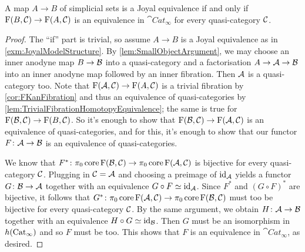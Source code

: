 \begin{lem}\label{lem:JoyalEquivalence}
	A map $A\rightarrow B$ of simplicial sets is a Joyal equivalence if and only if $\operatorname{F}(B,\mathcal{C})\rightarrow\operatorname{F}(A,\mathcal{C})$ is an equivalence in $\cat{Cat}_\infty$ for every quasi-category $\mathcal{C}$.
\end{lem}
\begin{proof}
	The \enquote{if} part is trivial, so assume $A\rightarrow B$ is a Joyal equivalence as in \cref{exm:JoyalModelStructure}.  By \cref{lem:SmallObjectArgument}, we may choose an inner anodyne map $B\rightarrow\mathcal{B}$ into a quasi-category and a factorisation $A\rightarrow\mathcal{A}\rightarrow\mathcal{B}$ into an inner anodyne map followed by an inner fibration. Then $\mathcal{A}$ is a quasi-category too. Note that $\operatorname{F}(\mathcal{A},\mathcal{C})\rightarrow \operatorname{F}(A,\mathcal{C})$ is a trivial fibration by \cref{cor:FKanFibration} and thus an equivalence of quasi-categories by \cref{lem:TrivialFibrationHomotopyEquivalence}; the same is true for $\operatorname{F}(\mathcal{B},\mathcal{C})\rightarrow \operatorname{F}(B,\mathcal{C})$. So it's enough to show that $\operatorname{F}(\mathcal{B},\mathcal{C})\rightarrow\operatorname{F}(\mathcal{A},\mathcal{C})$ is an equivalence of quasi-categories, and for this, it's enough to show that our functor $F\colon \mathcal{A}\rightarrow\mathcal{B}$ is an equivalence of quasi-categories.
	
	We know that $F^*\colon \pi_0\operatorname{core}\operatorname{F}(\mathcal{B},\mathcal{C})\rightarrow\pi_0\operatorname{core}\operatorname{F}(\mathcal{A},\mathcal{C})$ is bijective for every quasi-category $\mathcal{C}$. Plugging in $\mathcal{C}=\mathcal{A}$ and choosing a preimage of $\operatorname{id}_{\mathcal{A}}$ yields a functor $G\colon \mathcal{B}\rightarrow\mathcal{A}$ together with an equivalence $G\circ F\simeq \operatorname{id}_{\mathcal{A}}$. Since $F^*$ and $(G\circ F)^*$ are bijective, it follows that $G^*\colon \pi_0\operatorname{core}\operatorname{F}(\mathcal{A},\mathcal{C})\rightarrow\pi_0\operatorname{core}\operatorname{F}(\mathcal{B},\mathcal{C})$ must too be bijective for every quasi-category $\mathcal{C}$. By the same argument, we obtain $H\colon \mathcal{A}\rightarrow \mathcal{B}$ together with an equivalence $H\circ G\simeq \operatorname{id}_{\mathcal{B}}$. Then $G$ must be an isomorphism in $h(\mathrm{Cat}_\infty)$ and so $F$ must be too. This shows that $F$ is an equivalence in $\cat{Cat}_\infty$, as desired.
\end{proof}
